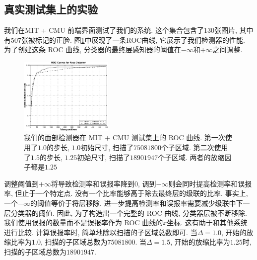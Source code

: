 \documentclass[a4paper,utf8,11pt, onecolumn]{ctexart}
\begin{document}
\subsection{真实测试集上的实验}
我们在MIT + CMU 前端界面测试了我们的系统\citep{rowley1998neural}. 这个集合包含了$130$张图片, 其中有$507$张被标记的正脸. 图\ref{fig:step_dif}中展现了一条ROC曲线, 它展示了我们检测器的性能. 为了创建这条 ROC 曲线, 分类器的最终层感知器的阈值在$-\infty$和$+\infty$之间调整. 
\begin{figure}[!b]
\centering
\includegraphics[width=0.4\textwidth]{step_dif.png}
\caption{我们的面部检测器在 MIT + CMU 测试集上的 ROC 曲线. 第一次使用了$1.0$的步长, $1.0$初始尺寸, 扫描了$75081800$个子区域. 第二次使用了$1.5$的步长, $1.25$初始尺寸, 扫描了$18901947$个子区域. 两者的放缩因子都是$1.25$}
\label{fig:step_dif}
\end{figure}
调整阈值到$+\infty$将导致检测率和误报率降到$0$, 调到$-\infty$则会同时提高检测率和误报率, 但止于一个特定点. 没有一个比率能够高于除去最终层的级联的比率.
事实上, 一个$-\infty$的阈值等价于将层移除. 进一步提高检测率和误报率需要减少级联中下一层分类器的阈值. 因此, 为了构造出一个完整的 ROC 曲线, 分类器层被不断移除.
我们使用误报的数量而不是误报率作为 ROC 曲线的$x$坐标. 这有助于和其他系统进行比较. 计算误报率时, 简单地除以扫描的子区域总数即可.
当$\Delta=1.0$, 开始的放缩比率为$1.0$, 扫描的子区域总数为$75081800$. 当$\Delta=1.5$, 开始的放缩比率为$1.25$时, 扫描的子区域总数为$18901947$.
\end{document}
